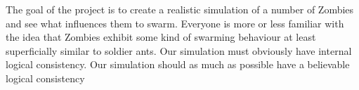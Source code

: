 \pagestyle{empty}
The goal of the project is to create a realistic simulation of a number of Zombies and see what influences them to swarm.
Everyone is more or less familiar with the idea that Zombies exhibit some kind of swarming behaviour at least superficially similar to soldier ants.
Our simulation must obviously have internal logical consistency.
Our simulation should as much as possible have a believable logical consistency
\clearpage
\endinput